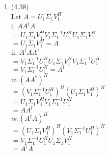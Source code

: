 \documentclass[letterpaper,12pt]{article}
\theoremstyle{definition}
\begin{document}
\begin{enumerate}
	\item(4.38)\\
	Let $A = U_{1}\Sigma_{1}V_{1}^{H}$\\
	i. $AA^{\dagger}A$\\
	   $ =  U_{1}\Sigma_{1}V_{1}^{H}V_{1}\Sigma_{1}^{-1}U_{1}^{H}U_{1}\Sigma_{1}V_{1}^{H}$\\
	   $ = U_{1}\Sigma_{1}V_{1}^{H} = A$\\
	ii. $A^{\dagger}AA^{\dagger}$\\
	   $ = V_{1}\Sigma_{1}^{-1}U_{1}^{H}U_{1}\Sigma_{1}V_{1}^{H}V_{1}\Sigma_{1}^{-1}U_{1}^{H}$\\
	   $ = V_{1}\Sigma_{1}^{-1}U_{1}^{H} = A^{\dagger}$\\
	iii.$ (AA^{\dagger})^{H}$\\
	   $ = (V_{1}\Sigma_{1}^{-1}U_{1}^{H})^{H}(U_{1}\Sigma_{1}V_{1}^{H})^{H}$\\
	   $ =  U_{1}\Sigma_{1}V_{1}^{H}V_{1}\Sigma_{1}^{-1}U_{1}^{H}$\\
	   $ = AA^{\dagger}$\\
	iv.$ (A^{\dagger}A)^{H}$\\
	   $ = (U_{1}\Sigma_{1}V_{1}^{H})^{H}(V_{1}\Sigma_{1}^{-1}U_{1}^{H})^{H}$\\
	   $ =  V_{1}\Sigma_{1}^{-1}U_{1}^{H}U_{1}\Sigma_{1}V_{1}^{H}$\\
	   $ = A^{\dagger}A$\\
	
	
	
	


\end{enumerate}

\vspace{25mm}
\end{document}
